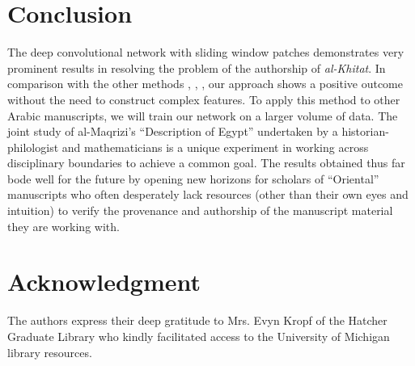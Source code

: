 \documentclass[conference,a4paper]{ieeetran}
\begin{document}
\section{Conclusion}

The deep convolutional network with sliding window patches demonstrates very prominent results in resolving the problem of the authorship of {\it al-Khitat}. In comparison with the other methods \cite{MBulacu}, \cite{MBulacu1}, \cite{DFecker}, \cite{Salvador} our approach shows a positive outcome without the need to construct complex features. To apply this method to other Arabic manuscripts, we will train our network on a larger volume of data. The joint study of al-Maqrizi's ``Description of Egypt'' undertaken by a historian-philologist and mathematicians is a unique experiment in working across disciplinary boundaries to achieve a common goal. The results obtained thus far bode well for the future by opening new horizons for scholars of ``Oriental'' manuscripts who often desperately lack resources (other than their own eyes and intuition) to verify the provenance and authorship of the manuscript material they are working with.

\section*{Acknowledgment}
The authors express their deep gratitude to Mrs. Evyn Kropf of the Hatcher Graduate Library who kindly facilitated access to the University of Michigan library resources.
 
\end{document}
